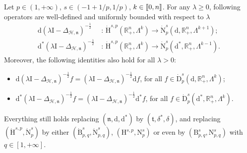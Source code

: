 \documentclass[10pt]{amsart}
\theoremstyle{definition}\newtheorem{defi}[theo]{Definition}\newtheorem{rema}[theo]{Remark}\newtheorem{exam}[theo]{Example}\newtheorem{exem}[theo]{Example}\newtheorem{nota}[theo]{Notation}
\newcommand{\bbR}{\mathbb{R}}
\newcommand{\rmH}{\mathrm{H}}%
\newcommand{\rmB}{\mathrm{B}}
\newcommand{\rmd}{\mathrm{d}}
\newcommand{\rmD}{\mathrm{D}}
\newcommand{\rmN}{\mathrm{N}}
\newcommand{\rmI}{\mathrm{I}}
\newcommand{\clH}{\mathcal{H}}
\newcommand{\fkn}{\mathfrak{n}}
\newcommand{\fkt}{\mathfrak{t}}
\newcommand{\llbracket}{\mathopen{[\mkern -2.7mu[}}
\newcommand{\rrbracket}{\mathclose{]\mkern -2.7mu]}}
\newcommand{\llb}{\llbracket}
\newcommand{\rrb}{\rrbracket}
\begin{document}
\begin{prop}\label{prop:RieszTransformHodgeHspBspqRn+}
Let $p\in(1,+\infty)$, $s\in(-1+1/p,1/p)$, $k\in\llb 0,n\rrb$. For any $\lambda\geqslant 0$, following operators are well-defined and uniformly bounded with respect to $\lambda$
\begin{align*}
\rmd\left(\lambda \rmI -\Delta_{\clH,\fkn}\right)^{-\frac{1}{2}}\,&:\,\dot{\rmH}^{s,p}\left(\bbR^{n}_+,\Lambda^k\right)\longrightarrow \dot{\rmN}^{s}_{p}\left(\rmd,\bbR^{n}_+,\Lambda^{k+1}\right);\\
\rmd^\ast\left(\lambda \rmI -\Delta_{\clH,\fkn}\right)^{-\frac{1}{2}}\,&:\,\dot{\rmH}^{s,p}\left(\bbR^{n}_+,\Lambda^k\right)\longrightarrow \dot{\rmN }^{s}_{p}\left(\rmd^\ast,\bbR^{n}_+,\Lambda^{k-1}\right).
\end{align*}
Moreover, the following identities also hold for all $\lambda>0$:
\begin{itemize}
\item $\rmd(\lambda \rmI -\Delta_{\clH,\fkn})^{-\frac{1}{2}}f = (\lambda \rmI -\Delta_{\clH,\fkn})^{-\frac{1}{2}} \rmd f$, \qquad for all $f\in\dot{\rmD}^s_{p}(\rmd,\bbR^n_+,\Lambda^k)$;
\item $\rmd^\ast(\lambda \rmI -\Delta_{\clH,\fkn})^{-\frac{1}{2}}f = (\lambda \rmI -\Delta_{\clH,\fkn})^{-\frac{1}{2}} \rmd^\ast f$, \qquad for all $f\in\dot{\rmD}^s_{p}(\rmd^\ast,\bbR^n_+,\Lambda^k)$.
\end{itemize}
Everything still holds replacing $(\fkn,\rmd,\rmd^\ast)$ by $(\fkt,\delta^\ast,\delta)$, and replacing $(\dot{\rmH}^{s,p},\dot{\rmN}^{s}_{p})$ by either $(\dot{\rmB}^{s}_{p,q},\dot{\rmN }^{s}_{p,q})$, $({\rmH}^{s,p},{\rmN}^{s}_{p})$ or even by $({\rmB}^{s}_{p,q},{\rmN}^{s}_{p,q})$ with $q\in[1,+\infty]$.
\end{prop}
\end{document}
